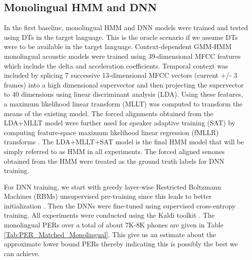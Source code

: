 \documentclass[a4paper]{article}
\begin{document}








\vspace{-3mm}
\subsection{Monolingual HMM and DNN} \vspace{-2mm}
\label{sec:Monolingual HMM and DNN}
In the first baseline, monolingual HMM and DNN models were trained and tested using DTs in the target language. This is the oracle scenario if we assume DTs were to be available in the target language. Context-dependent GMM-HMM monolingual acoustic models were trained using 39-dimensional MFCC features which include the delta and acceleration coefficients. Temporal context was included by splicing 7 successive 13-dimensional MFCC vectors (current +/- 3 frames) into a high dimensional supervector and then projecting the supervector to 40 dimensions using linear discriminant analysis (LDA). Using these features, a maximum likelihood linear transform (MLLT) \cite{Gopinath-MLLT} was computed to transform the means of the existing model. The forced alignments obtained from the LDA+MLLT model were further used for speaker adaptive training (SAT) by computing feature-space maximum likelihood linear regression (fMLLR) transforms \cite{Gales-CMLLR}. The LDA+MLLT+SAT model is the final HMM model that will be simply referred to as HMM in all experiments. The forced aligned senones obtained from the HMM were treated as the ground truth labels for DNN training. 

For DNN training, we start with greedy layer-wise Restricted Boltzmann Machines (RBMs) unsupervised pre-training since this leads to better initialization \cite{Bengio-Pretraining}. Then the DNNs were fine-tuned using supervised cross-entropy training.  All experiments were conducted using the Kaldi toolkit \cite{Povey-Kaldi}. The monolingual PERs over a total of about 7K-8K phones  are given in Table \ref{Tab:PER_Matched_Monolingual}. This give us an estimate about the approximate lower bound PERs thereby indicating this is possibly the best we can achieve.
 \vspace{-3mm}
\end{document}
